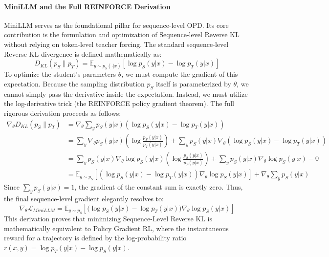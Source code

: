 \documentclass{article} %
\begin{document}
\paragraph{MiniLLM and the Full REINFORCE Derivation}
MiniLLM \citep{2306.08543} serves as the foundational pillar for sequence-level OPD. Its core contribution is the formulation and optimization of Sequence-level Reverse KL without relying on token-level teacher forcing.
The standard sequence-level Reverse KL divergence is defined mathematically as:
\begin{equation}
    D_{KL}(p_S \parallel p_T) = \mathbb{E}_{y \sim p_S(\cdot|x)} \left[ \log p_S(y|x) - \log p_T(y|x) \right]
\end{equation}
To optimize the student's parameters $\theta$, we must compute the gradient of this expectation. Because the sampling distribution $p_S$ itself is parameterized by $\theta$, we cannot simply pass the derivative inside the expectation. Instead, we must utilize the log-derivative trick (the REINFORCE policy gradient theorem). The full rigorous derivation proceeds as follows:
\begin{align}
    \nabla_\theta D_{KL}(p_S \parallel p_T) &= \nabla_\theta \sum_y p_S(y|x) \left( \log p_S(y|x) - \log p_T(y|x) \right) \nonumber \\
    &= \sum_y \nabla_\theta p_S(y|x) \left( \log \frac{p_S(y|x)}{p_T(y|x)} \right) + \sum_y p_S(y|x) \nabla_\theta \left( \log p_S(y|x) - \log p_T(y|x) \right) \nonumber \\
    &= \sum_y p_S(y|x) \nabla_\theta \log p_S(y|x) \left( \log \frac{p_S(y|x)}{p_T(y|x)} \right) + \sum_y p_S(y|x) \nabla_\theta \log p_S(y|x) - 0 \nonumber \\
    &= \mathbb{E}_{y \sim p_S} \left[ \left( \log p_S(y|x) - \log p_T(y|x) \right) \nabla_\theta \log p_S(y|x) \right] + \nabla_\theta \sum_y p_S(y|x)
\end{align}
Since $\sum_y p_S(y|x) = 1$, the gradient of the constant sum is exactly zero. Thus, the final sequence-level gradient elegantly resolves to:
\begin{equation}
    \nabla_\theta \mathcal{L}_{MiniLLM} = \mathbb{E}_{y \sim p_S} \left[ \Big( \log p_S(y|x) - \log p_T(y|x) \Big) \nabla_\theta \log p_S(y|x) \right]
    \label{eq:minillm_final}
\end{equation}
This derivation proves that minimizing Sequence-Level Reverse KL is mathematically equivalent to Policy Gradient RL, where the instantaneous reward for a trajectory is defined by the log-probability ratio $r(x, y) = \log p_T(y|x) - \log p_S(y|x)$.
\end{document}
